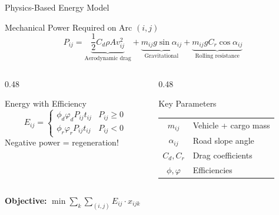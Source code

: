 \documentclass[aspectratio=169,11pt]{beamer}
\begin{document}
\begin{frame}{Physics-Based Energy Model}
    \begin{block}{Mechanical Power Required on Arc $(i,j)$}
        \[
        P_{ij} = \underbrace{\frac{1}{2} C_d \rho A v_{ij}^2}_{\text{Aerodynamic drag}} +
                 \underbrace{m_{ij} g \sin\alpha_{ij}}_{\text{Gravitational}} +
                 \underbrace{m_{ij} g C_r \cos\alpha_{ij}}_{\text{Rolling resistance}}
        \]
    \end{block}

    \begin{columns}[T]
        \begin{column}{0.48\textwidth}
            \begin{block}{Energy with Efficiency}
                \[
                E_{ij} = \begin{cases}
                    \phi_d \varphi_d P_{ij} t_{ij} & P_{ij} \geq 0 \\
                    \phi_r \varphi_r P_{ij} t_{ij} & P_{ij} < 0
                \end{cases}
                \]
                \small Negative power = regeneration!
            \end{block}
        \end{column}
        \begin{column}{0.48\textwidth}
            \begin{block}{Key Parameters}
                \small
                \begin{tabular}{cl}
                    $m_{ij}$ & Vehicle + cargo mass \\
                    $\alpha_{ij}$ & Road slope angle \\
                    $C_d, C_r$ & Drag coefficients \\
                    $\phi, \varphi$ & Efficiencies
                \end{tabular}
            \end{block}
        \end{column}
    \end{columns}

    \vspace{0.3cm}
    \begin{center}
        \textbf{Objective:} $\displaystyle\min \sum_{k} \sum_{(i,j)} E_{ij} \cdot x_{ijk}$
    \end{center}
\end{frame}
\end{document}
